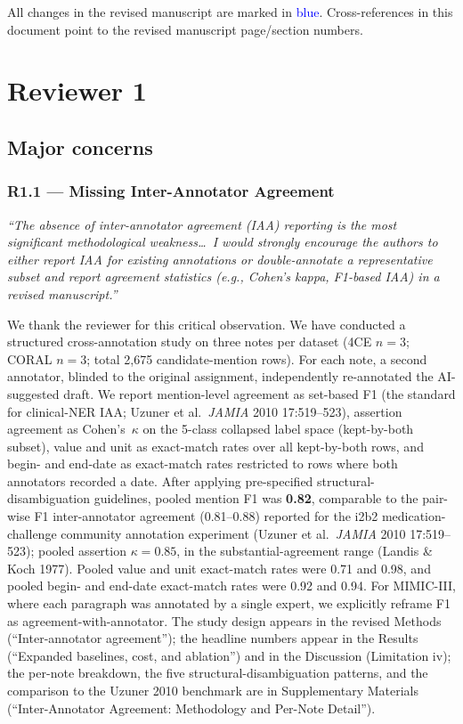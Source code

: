 \documentclass[11pt,letterpaper]{article}
\newcommand{\reviewer}[1]{\par\medskip\textcolor{blue!75!black}{\textit{#1}}\par\medskip}
\newcommand{\response}[1]{\par#1\par\medskip}
\begin{document}
All changes in the revised manuscript are marked in \textcolor{blue}{blue}. Cross-references in this document point to the revised manuscript page/section numbers.

\hrulefill

\section{Reviewer 1}

\subsection*{Major concerns}

\subsubsection*{R1.1 --- Missing Inter-Annotator Agreement}
\reviewer{``The absence of inter-annotator agreement (IAA) reporting is the most significant methodological weakness\dots\ I would strongly encourage the authors to either report IAA for existing annotations or double-annotate a representative subset and report agreement statistics (e.g., Cohen's kappa, F1-based IAA) in a revised manuscript.''}
\response{We thank the reviewer for this critical observation. We have conducted a structured cross-annotation study on three notes per dataset (4CE $n=3$; CORAL $n=3$; total 2{,}675 candidate-mention rows). For each note, a second annotator, blinded to the original assignment, independently re-annotated the AI-suggested draft. We report mention-level agreement as set-based F1 (the standard for clinical-NER IAA; Uzuner et al.\ \textit{JAMIA} 2010 17:519--523), assertion agreement as Cohen's~$\kappa$ on the 5-class collapsed label space (kept-by-both subset), value and unit as exact-match rates over all kept-by-both rows, and begin- and end-date as exact-match rates restricted to rows where both annotators recorded a date. After applying pre-specified structural-disambiguation guidelines, pooled mention F1 was \textbf{0.82}, comparable to the pair-wise F1 inter-annotator agreement (0.81--0.88) reported for the i2b2 medication-challenge community annotation experiment (Uzuner et al.\ \textit{JAMIA} 2010 17:519--523); pooled assertion $\kappa = 0.85$, in the substantial-agreement range (Landis \& Koch 1977). Pooled value and unit exact-match rates were 0.71 and 0.98, and pooled begin- and end-date exact-match rates were 0.92 and 0.94. For MIMIC-III, where each paragraph was annotated by a single expert, we explicitly reframe F1 as agreement-with-annotator. The study design appears in the revised Methods (``Inter-annotator agreement''); the headline numbers appear in the Results (``Expanded baselines, cost, and ablation'') and in the Discussion (Limitation iv); the per-note breakdown, the five structural-disambiguation patterns, and the comparison to the Uzuner 2010 benchmark are in Supplementary Materials (``Inter-Annotator Agreement: Methodology and Per-Note Detail'').}
\end{document}
